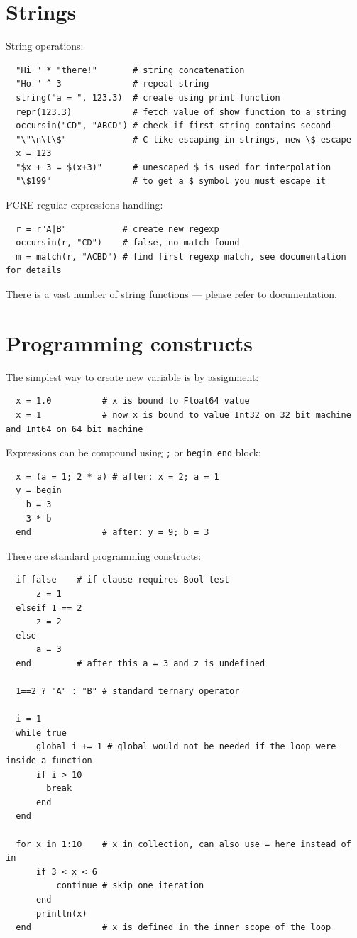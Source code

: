 \documentclass[10pt,a4paper]{article}
\begin{document}
\section{Strings}
String operations:
\begin{lstlisting}
  "Hi " * "there!"       # string concatenation
  "Ho " ^ 3              # repeat string
  string("a = ", 123.3)  # create using print function
  repr(123.3)            # fetch value of show function to a string
  occursin("CD", "ABCD") # check if first string contains second
  "\"\n\t\$"             # C-like escaping in strings, new \$ escape
  x = 123
  "$x + 3 = $(x+3)"      # unescaped $ is used for interpolation
  "\$199"                # to get a $ symbol you must escape it
\end{lstlisting}

PCRE regular expressions handling:
\begin{lstlisting}
  r = r"A|B"           # create new regexp
  occursin(r, "CD")    # false, no match found
  m = match(r, "ACBD") # find first regexp match, see documentation for details
\end{lstlisting}

There is a vast number of string functions --- please refer to documentation.

\section{Programming constructs}
The simplest way to create new variable is by assignment:
\begin{lstlisting}
  x = 1.0          # x is bound to Float64 value
  x = 1            # now x is bound to value Int32 on 32 bit machine and Int64 on 64 bit machine
\end{lstlisting}

Expressions can be compound using \lstinline|;| or \lstinline|begin end| block:
\begin{lstlisting}
  x = (a = 1; 2 * a) # after: x = 2; a = 1
  y = begin
    b = 3
    3 * b
  end              # after: y = 9; b = 3
\end{lstlisting}

There are standard programming constructs:
\begin{lstlisting}
  if false    # if clause requires Bool test
      z = 1
  elseif 1 == 2
      z = 2
  else
      a = 3
  end         # after this a = 3 and z is undefined

  1==2 ? "A" : "B" # standard ternary operator

  i = 1
  while true
      global i += 1 # global would not be needed if the loop were inside a function
      if i > 10
        break
      end
  end

  for x in 1:10    # x in collection, can also use = here instead of in
      if 3 < x < 6
          continue # skip one iteration
      end
      println(x)
  end              # x is defined in the inner scope of the loop
\end{lstlisting}
\end{document}
